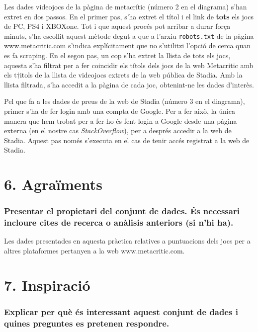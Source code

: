 \documentclass[]{article}
\begin{document}
Les dades videojocs de la pàgina de metacrític (número 2 en el diagrama)
s'han extret en dos passos. En el primer pas, s'ha extret el títol i el
link de \textbf{tots} els jocs de PC, PS4 i XBOXone. Tot i que aquest
procés pot arribar a durar força minuts, s'ha escollit aquest mètode
degut a que a l'arxiu \texttt{robots.txt} de la pàgina
www.metacritic.com s'indica explícitament que no s'utilitzi l'opció de
cerca quan es fa scraping. En el segon pas, un cop s'ha extret la llista
de tots els jocs, aquesta s'ha filtrat per a fer coincidir els títols
dels jocs de la web Metacritic amb els t†itols de la llista de videojocs
extrets de la web pública de Stadia. Amb la llista filtrada, s'ha
accedit a la pàgina de cada joc, obtenint-ne les dades d'interès.

Pel que fa a les dades de preus de la web de Stadia (número 3 en el
diagrama), primer s'ha de fer login amb una compta de Google. Per a fer
això, la única manera que hem trobat per a fer-ho és fent login a Google
desde una pàgina externa (en el nostre cas \emph{StackOverflow}), per a
després accedir a la web de Stadia. Aquest pas només s'executa en el cas
de tenir accés registrat a la web de Stadia.

\hypertarget{agrauxefments}{%
\section{6. Agraïments}\label{agrauxefments}}

\hypertarget{presentar-el-propietari-del-conjunt-de-dades.-uxe9s-necessari-incloure-cites-de-recerca-o-anuxe0lisis-anteriors-si-nhi-ha.}{%
\subsubsection{Presentar el propietari del conjunt de dades. És
necessari incloure cites de recerca o anàlisis anteriors (si n'hi
ha).}\label{presentar-el-propietari-del-conjunt-de-dades.-uxe9s-necessari-incloure-cites-de-recerca-o-anuxe0lisis-anteriors-si-nhi-ha.}}

Les dades presentades en aquesta pràctica relatives a puntuacions dels
jocs per a altres plataformes pertanyen a la web www.metacritic.com.

\hypertarget{inspiraciuxf3}{%
\section{7. Inspiració}\label{inspiraciuxf3}}

\hypertarget{explicar-per-quuxe8-uxe9s-interessant-aquest-conjunt-de-dades-i-quines-preguntes-es-pretenen-respondre.}{%
\subsubsection{Explicar per què és interessant aquest conjunt de dades i
quines preguntes es pretenen
respondre.}\label{explicar-per-quuxe8-uxe9s-interessant-aquest-conjunt-de-dades-i-quines-preguntes-es-pretenen-respondre.}}
\end{document}
